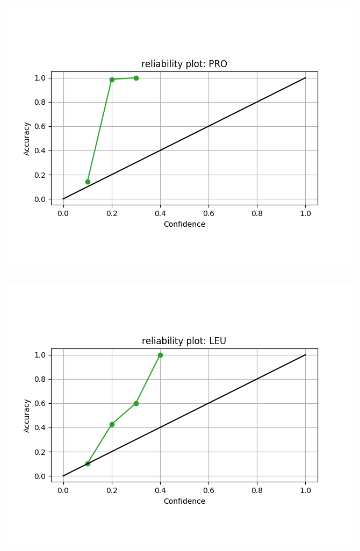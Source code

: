 \begin{figure}[!ht]
\begin{minipage}[b]{0.45\linewidth}
\begin{subfigure}[b]{\linewidth}
	\includegraphics[width=1.27\textwidth]{pics/rel_PRO_22_SRS}
\end{subfigure}
\begin{subfigure}[b]{\linewidth}
	\includegraphics[width=1.27\textwidth]{pics/rel_LEU_22_SRS}
\end{subfigure}


\end{minipage}
\end{figure}
